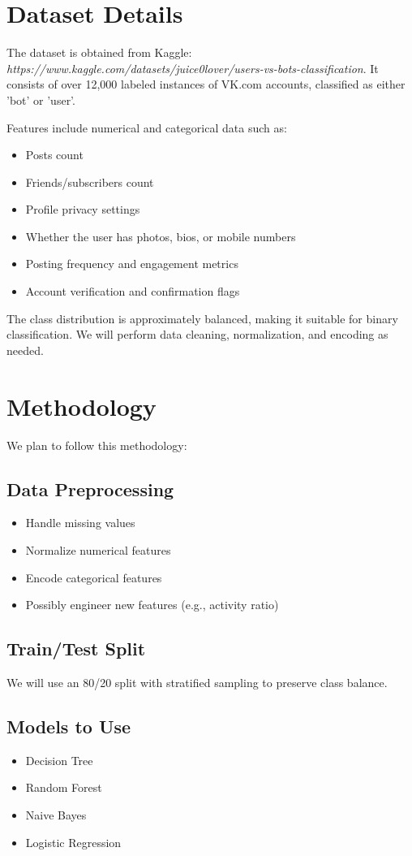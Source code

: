 \documentclass[conference]{IEEEtran}
\begin{document}
\section{Dataset Details}
The dataset is obtained from Kaggle: \textit{https://www.kaggle.com/datasets/juice0lover/users-vs-bots-classification}. It consists of over 12,000 labeled instances of VK.com accounts, classified as either 'bot' or 'user'.

Features include numerical and categorical data such as:
\begin{itemize}
    \item Posts count
    \item Friends/subscribers count
    \item Profile privacy settings
    \item Whether the user has photos, bios, or mobile numbers
    \item Posting frequency and engagement metrics
    \item Account verification and confirmation flags
\end{itemize}
The class distribution is approximately balanced, making it suitable for binary classification. We will perform data cleaning, normalization, and encoding as needed.

\section{Methodology}
We plan to follow this methodology:

\subsection{Data Preprocessing}
\begin{itemize}
    \item Handle missing values
    \item Normalize numerical features
    \item Encode categorical features
    \item Possibly engineer new features (e.g., activity ratio)
\end{itemize}

\subsection{Train/Test Split}
We will use an 80/20 split with stratified sampling to preserve class balance.

\subsection{Models to Use}
\begin{itemize}
    \item Decision Tree
    \item Random Forest
    \item Naive Bayes
    \item Logistic Regression
\end{itemize}
\end{document}
